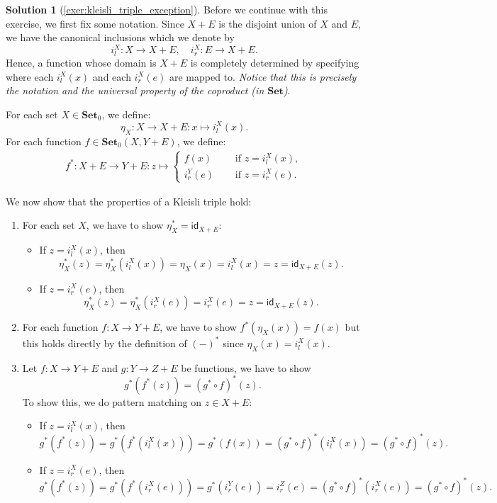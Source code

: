 \documentclass[a4paper,11pt, oneside,titlepage=false]{scrbook}
\theoremstyle{plain}
\theoremstyle{definition}
\newtheorem{solution}[thm]{Solution}
\newcommand{\cfont}[1]{\ensuremath{\mathsf{#1}}}
\newcommand{\Catb}[1]{\mathbf{#1}}
\newcommand{\SET}{\Catb{Set}}
\newcommand{\Ob}[1]{{#1}_0}
\newcommand{\CHom}[3]{{#1}(#2,#3)}
\newcommand{\Id}[1][]{\cfont{id}_{#1}}
\newcommand{\co}[2]{\ensuremath{#2 \circ #1}}
\begin{document}
\begin{solution}[\cref{exer:kleisli_triple_exception}]
\label{sol:kleisli_triple_exception}
Before we continue with this exercise, we first fix some notation. Since $X+E$ is the disjoint union of $X$ and $E$, we have the canonical inclusions which we denote by
\[ i^X_l : X\to X + E, \quad i^X_r : E\to X+E. \]
Hence, a function whose domain is $X+E$ is completely determined by specifying where each $i^X_l(x)$ and each $i^X_r(e)$ are mapped to. \textit{Notice that this is precisely the notation and the universal property of the coproduct (in $\SET$)}.

For each set $X\in\Ob \SET$, we define:
\[
\eta_X : X \to X+E : x\mapsto i^X_l(x).
\]
For each function $f\in\CHom{\Ob \SET}{X}{Y+E}$, we define:
\begin{align*}
f^{*} :X+E \to Y+E : z \mapsto
\begin{cases}
f(x) &\quad \text{ if } z=i^X_l(x),\\
i^Y_r(e) &\quad \text{ if } z=i^X_r(e).
\end{cases}
\end{align*}


We now show that the properties of a Kleisli triple hold:
\begin{enumerate}
\item For each set $X$, we have to show $\eta_X^{*} = \Id[X+E]$:
\begin{itemize}
\item If $z=i^X_l(x)$, then
\[
\eta_X^{*}(z) = \eta_X^{*}(i^X_l(x)) = \eta_X(x) = i^X_l(x) = z = \Id[X+E](z).
\]
\item If $z=i^X_r(e)$, then
\[
\eta_X^{*}(z) = \eta_X^{*}(i^X_r(e)) = i^X_r(e) = z = \Id[X+E](z).
\]
\end{itemize}

\item For each function $f:X\to Y + E$, we have to show $f^{*}(\eta_X(x)) = f(x)$ but this holds directly by the definition of $(-)^{*}$ since $\eta_X(x)=i_l^X(x)$.

\item Let $f:X\to Y + E$ and $g:Y\to Z + E$ be functions, we have to show
\[
g^{*}(f^{*}(z)) = (\co{f}{g^{*}})^{*}(z).
\]
To show this, we do pattern matching on $z\in X+E$:
\begin{itemize}
\item If $z=i^X_l(x)$, then
\[
g^{*}(f^{*}(z)) = g^{*}(f^{*}(i_l^X(x))) = g^{*}(f(x)) = (\co{f}{g^{*}})^{*}(i_l^X(x)) = (\co{f}{g^{*}})^{*}(z).
\]
\item If $z=i^X_r(e)$, then
\[
g^{*}(f^{*}(z)) = g^{*}(f^{*}(i_r^X(e))) = g^{*}(i_r^Y(e)) = i_r^Z(e) = (\co{f}{g^{*}})^{*}(i_r^X(e)) = (\co{f}{g^{*}})^{*}(z).
\]
\end{itemize}

\end{enumerate}
\end{solution}
\end{document}
